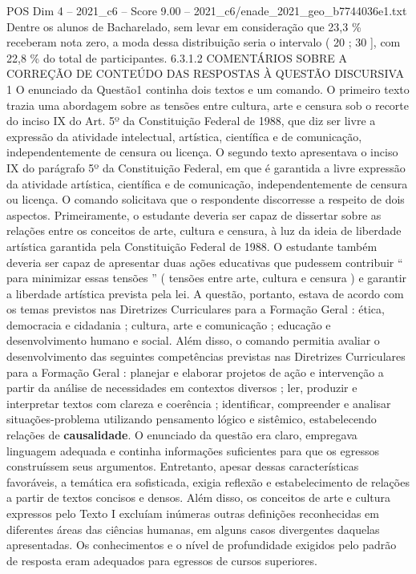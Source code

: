 \begin{textsample}{POS Dim 4 – 2021\_c6 – Score 9.00 – 2021\_c6/enade\_2021\_geo\_b7744036e1.txt}
Dentre os alunos de Bacharelado, sem levar em consideração que 23,3 \% receberam nota zero, a moda dessa distribuição seria o intervalo ( 20 ; 30 ], com 22,8 \% do total de participantes. 6.3.1.2 COMENTÁRIOS SOBRE A CORREÇÃO DE CONTEÚDO DAS RESPOSTAS À QUESTÃO DISCURSIVA 1 O enunciado da Questão1 continha dois textos e um comando.
O primeiro texto trazia uma abordagem sobre as tensões entre cultura, arte e censura sob o recorte do inciso IX do Art. 5º da Constituição Federal de 1988, que diz ser livre a expressão da atividade intelectual, artística, científica e de comunicação, independentemente de censura ou licença.
O segundo texto apresentava o inciso IX do parágrafo 5º da Constituição Federal, em que é garantida a livre expressão da atividade artística, científica e de comunicação, independentemente de censura ou licença.
O comando solicitava que o respondente discorresse a respeito de dois aspectos.
Primeiramente, o estudante deveria ser capaz de dissertar sobre as relações entre os conceitos de arte, cultura e censura, à luz da ideia de liberdade artística garantida pela Constituição Federal de 1988.
O estudante também deveria ser capaz de apresentar duas ações educativas que pudessem contribuir “ para minimizar essas tensões ” ( tensões entre arte, cultura e censura ) e garantir a liberdade artística prevista pela lei.
A questão, portanto, estava de acordo com os temas previstos nas Diretrizes Curriculares para a Formação Geral : ética, democracia e cidadania ; cultura, arte e comunicação ; educação e desenvolvimento humano e social.
Além disso, o comando permitia avaliar o desenvolvimento das seguintes competências previstas nas Diretrizes Curriculares para a Formação Geral : planejar e elaborar projetos de ação e intervenção a partir da análise de necessidades em contextos diversos ; ler, produzir e interpretar textos com clareza e coerência ; identificar, compreender e analisar situações-problema utilizando pensamento lógico e sistêmico, estabelecendo relações de \textbf{causalidade}.
O enunciado da questão era claro, empregava linguagem adequada e continha informações suficientes para que os egressos construíssem seus argumentos.
Entretanto, apesar dessas características favoráveis, a temática era sofisticada, exigia reflexão e estabelecimento de relações a partir de textos concisos e densos.
Além disso, os conceitos de arte e cultura expressos pelo Texto I excluíam inúmeras outras definições reconhecidas em diferentes áreas das ciências humanas, em alguns casos divergentes daquelas apresentadas.
Os conhecimentos e o nível de profundidade exigidos pelo padrão de resposta eram adequados para egressos de cursos superiores.

\end{textsample}
